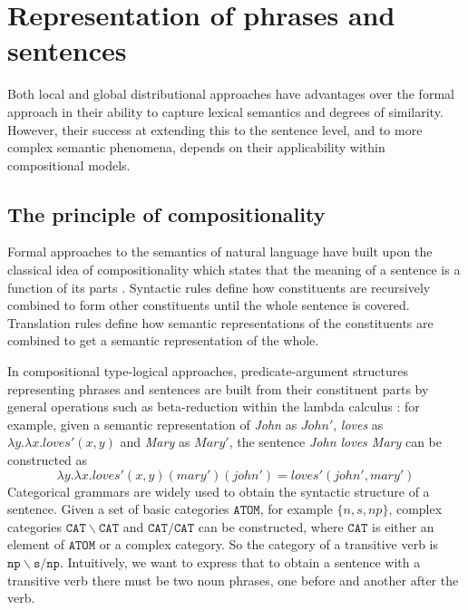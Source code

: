 \section{Representation of phrases and sentences}
\label{sec:similarity-compounds}

Both local and global distributional approaches have advantages over the formal approach in their ability to capture lexical semantics and degrees of similarity. However, their success at extending this to the sentence level, and to more complex semantic phenomena, depends on their applicability within compositional models.

\subsection{The principle of compositionality}
\label{sec:formal-semantics}

Formal approaches to the semantics of natural language have built upon the classical idea of compositionality which states that the meaning of a sentence is a function of its parts \cite{Janssen2001}. Syntactic rules define how constituents are recursively combined to form other constituents until the whole sentence is covered. Translation rules define how semantic representations of the constituents are combined to get a semantic representation of the whole.

In compositional type-logical approaches, predicate-argument structures representing phrases and sentences are built from their constituent parts by general operations such as beta-reduction within the lambda calculus \cite{THEO:THEO373}: for example, given a semantic representation of \emph{John}
as $\mathit{John}'$, \emph{loves} as $\lambda y.\lambda x.\mathit{loves}'(x, y)$ and \emph{Mary} as $\mathit{Mary'}$, the sentence \emph{John loves Mary} can be constructed as
%
\begin{equation*}
\lambda y.\lambda
x.\mathit{loves}'(x, y)(\mathit{mary}')(\mathit{john}') =
\mathit{loves}'(\mathit{john}', \mathit{mary}')
\end{equation*}
%
Categorical grammars are widely used to obtain the syntactic structure of a sentence. Given a set of basic categories $\texttt{ATOM}$, for example $\{\mathit{n}, \mathit{s}, \mathit{np}\}$, complex categories $\mathtt{CAT} \backslash \mathtt{CAT}$ and $\mathtt{CAT}/\mathtt{CAT}$ can be constructed, where $\mathtt{CAT}$ is either an element of $\texttt{ATOM}$ or a complex category. So the category of a transitive verb is $\mathtt{np}\backslash\mathtt{s}/\mathtt{np}$. Intuitively, we want to express that to obtain a sentence with a transitive verb there must be two noun phrases, one before and another after the verb.


